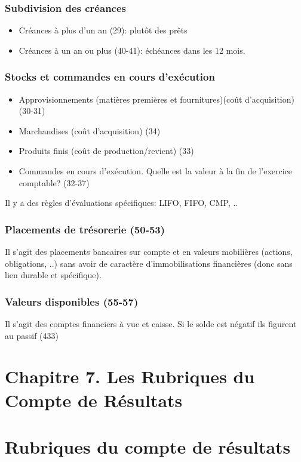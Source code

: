 \documentclass{article}
\begin{document}
\subsubsection*{Subdivision des créances}
\begin{itemize}
    \item Créances à plus d'un an (29): plutôt des prêts
    \item Créances à un an ou plus (40-41): échéances dans les 12 mois. 
\end{itemize}
\subsubsection*{Stocks et commandes en cours d'exécution}
\begin{itemize}
    \item Approvisionnements (matières premières et fournitures)(coût d'acquisition) (30-31)
    \item Marchandises (coût d'acquisition) (34)
    \item Produits finis (coût de production/revient) (33)
    \item Commandes en cours d'exécution. Quelle est la valeur à la fin de l'exercice comptable? (32-37)
\end{itemize}
Il y a des règles d'évaluations spécifiques: LIFO, FIFO, CMP, ..
\subsubsection*{Placements de trésorerie (50-53)}
Il s'agit des placements bancaires sur compte et en valeurs mobilières (actions, obligations, ..) sans avoir de caractère d'immobilisations financières (donc sans lien durable et spécifique).

\subsubsection*{Valeurs disponibles (55-57)}
Il s'agit des comptes financiers à vue et caisse. 
Si le solde est négatif ils figurent au passif (433)
\section*{Chapitre 7. Les Rubriques du Compte de Résultats}
\section{Rubriques du compte de résultats}
\end{document}
